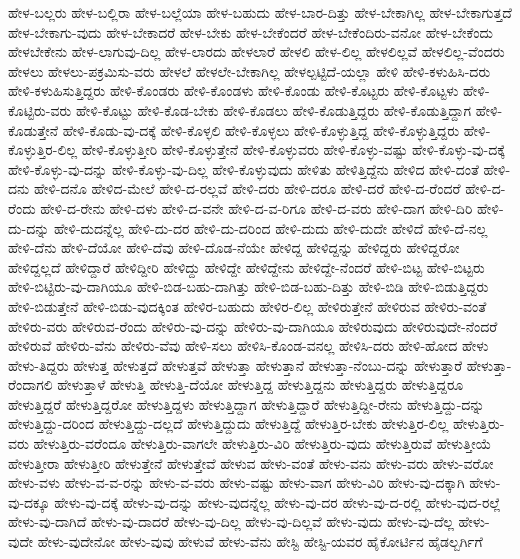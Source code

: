 {ಹೇಳ-ಬಲ್ಲರು
ಹೇಳ-ಬಲ್ಲಿರಾ
ಹೇಳ-ಬಲ್ಲೆಯಾ
ಹೇಳ-ಬಹುದು
ಹೇಳ-ಬಾರ-ದಿತ್ತು
ಹೇಳ-ಬೇಕಾಗಿಲ್ಲ
ಹೇಳ-ಬೇಕಾಗುತ್ತದೆ
ಹೇಳ-ಬೇಕಾಗು-ವುದು
ಹೇಳ-ಬೇಕಾದರೆ
ಹೇಳ-ಬೇಕು
ಹೇಳ-ಬೇಕೆಂದರೆ
ಹೇಳ-ಬೇಕೆಂದಿರು-ವನೋ
ಹೇಳ-ಬೇಕೆಂದು
ಹೇಳಬೇಕೇನು
ಹೇಳ-ಲಾಗುವು-ದಿಲ್ಲ
ಹೇಳ-ಲಾರದು
ಹೇಳಲಾರೆ
ಹೇಳಲಿ
ಹೇಳ-ಲಿಲ್ಲ
ಹೇಳಲಿಲ್ಲವೆ
ಹೇಳಲಿಲ್ಲ-ವೆಂದರು
ಹೇಳಲು
ಹೇಳಲು-ಪಕ್ರಮಿಸು-ವರು
ಹೇಳಲೆ
ಹೇಳಲೇ-ಬೇಕಾಗಿಲ್ಲ
ಹೇಳಲ್ಪಟ್ಟಿದೆ-ಯಲ್ಲಾ
ಹೇಳಿ
ಹೇಳಿ-ಕಳುಹಿಸಿ-ದರು
ಹೇಳಿ-ಕಳುಹಿಸುತ್ತಿದ್ದರು
ಹೇಳಿ-ಕೊಂಡರು
ಹೇಳಿ-ಕೊಂಡಳು
ಹೇಳಿ-ಕೊಂಡು
ಹೇಳಿ-ಕೊಟ್ಟರು
ಹೇಳಿ-ಕೊಟ್ಟಳು
ಹೇಳಿ-ಕೊಟ್ಟಿರು-ವರು
ಹೇಳಿ-ಕೊಟ್ಟು
ಹೇಳಿ-ಕೊಡ-ಬೇಕು
ಹೇಳಿ-ಕೊಡಲು
ಹೇಳಿ-ಕೊಡುತ್ತಿದ್ದರು
ಹೇಳಿ-ಕೊಡುತ್ತಿದ್ದಾಗ
ಹೇಳಿ-ಕೊಡುತ್ತೇನೆ
ಹೇಳಿ-ಕೊಡು-ವು-ದಕ್ಕೆ
ಹೇಳಿ-ಕೊಳ್ಳಲಿ
ಹೇಳಿ-ಕೊಳ್ಳಲು
ಹೇಳಿ-ಕೊಳ್ಳುತ್ತಿದ್ದ
ಹೇಳಿ-ಕೊಳ್ಳುತ್ತಿದ್ದರು
ಹೇಳಿ-ಕೊಳ್ಳುತ್ತಿರ-ಲಿಲ್ಲ
ಹೇಳಿ-ಕೊಳ್ಳುತ್ತೀರಿ
ಹೇಳಿ-ಕೊಳ್ಳುತ್ತೇನೆ
ಹೇಳಿ-ಕೊಳ್ಳುವರು
ಹೇಳಿ-ಕೊಳ್ಳು-ವಷ್ಟು
ಹೇಳಿ-ಕೊಳ್ಳು-ವು-ದಕ್ಕೆ
ಹೇಳಿ-ಕೊಳ್ಳು-ವು-ದನ್ನು
ಹೇಳಿ-ಕೊಳ್ಳು-ವು-ದಿಲ್ಲ
ಹೇಳಿ-ಕೊಳ್ಳುವುದು
ಹೇಳಿತು
ಹೇಳಿತ್ತಿದ್ದೆನು
ಹೇಳಿದ
ಹೇಳಿ-ದಂತೆ
ಹೇಳಿ-ದನು
ಹೇಳಿ-ದನೊ
ಹೇಳಿದ-ಮೇಲೆ
ಹೇಳಿ-ದ-ರಲ್ಲವೆ
ಹೇಳಿ-ದರು
ಹೇಳಿ-ದರೂ
ಹೇಳಿ-ದರೆ
ಹೇಳಿ-ದ-ರೆಂದರೆ
ಹೇಳಿ-ದ-ರೆಂದು
ಹೇಳಿ-ದ-ರೇನು
ಹೇಳಿ-ದಳು
ಹೇಳಿ-ದ-ವನೇ
ಹೇಳಿ-ದ-ವ-ರಿಗೂ
ಹೇಳಿ-ದ-ವರು
ಹೇಳಿ-ದಾಗ
ಹೇಳಿ-ದಿರಿ
ಹೇಳಿ-ದು-ದನ್ನು
ಹೇಳಿ-ದುದನ್ನೆಲ್ಲ
ಹೇಳಿ-ದು-ದರ
ಹೇಳಿ-ದು-ದರಿಂದ
ಹೇಳಿ-ದುದು
ಹೇಳಿ-ದುದೇ
ಹೇಳಿದೆ
ಹೇಳಿ-ದೆ-ನಲ್ಲ
ಹೇಳಿ-ದೆನು
ಹೇಳಿ-ದೆಯೋ
ಹೇಳಿ-ದೆವು
ಹೇಳಿ-ದೊಡ-ನೆಯೇ
ಹೇಳಿದ್ದ
ಹೇಳಿದ್ದನ್ನು
ಹೇಳಿದ್ದರು
ಹೇಳಿದ್ದರೋ
ಹೇಳಿದ್ದಲ್ಲದೆ
ಹೇಳಿದ್ದಾರೆ
ಹೇಳಿದ್ದೀರಿ
ಹೇಳಿದ್ದು
ಹೇಳಿದ್ದೇ
ಹೇಳಿದ್ದೇನು
ಹೇಳಿದ್ದೇ-ನೆಂದರೆ
ಹೇಳಿ-ಬಿಟ್ಟ
ಹೇಳಿ-ಬಿಟ್ಟರು
ಹೇಳಿ-ಬಿಟ್ಟಿರು-ವು-ದಾಗಿಯೂ
ಹೇಳಿ-ಬಿಡ-ಬಹು-ದಾಗಿತ್ತು
ಹೇಳಿ-ಬಿಡ-ಬಹು-ದಿತ್ತು
ಹೇಳಿ-ಬಿಡಿ
ಹೇಳಿ-ಬಿಡುತ್ತಿದ್ದರು
ಹೇಳಿ-ಬಿಡುತ್ತೇನೆ
ಹೇಳಿ-ಬಿಡು-ವುದಕ್ಕಿಂತ
ಹೇಳಿರ-ಬಹುದು
ಹೇಳಿರ-ಲಿಲ್ಲ
ಹೇಳಿರುತ್ತೇನೆ
ಹೇಳಿರುವ
ಹೇಳಿರು-ವಂತೆ
ಹೇಳಿರು-ವರು
ಹೇಳಿರುವ-ರೆಂದು
ಹೇಳಿರು-ವು-ದನ್ನು
ಹೇಳಿರು-ವು-ದಾಗಿಯೂ
ಹೇಳಿರುವುದು
ಹೇಳಿರುವುದೇ-ನೆಂದರೆ
ಹೇಳಿರುವೆ
ಹೇಳಿರು-ವೆನು
ಹೇಳಿರು-ವೆವು
ಹೇಳಿ-ಸಲು
ಹೇಳಿಸಿ-ಕೊಂಡ-ವನಲ್ಲ
ಹೇಳಿಸಿ-ದರು
ಹೇಳಿ-ಹೋದ
ಹೇಳು
ಹೇಳು-ತಿದ್ದರು
ಹೇಳುತ್ತ
ಹೇಳುತ್ತದೆ
ಹೇಳುತ್ತವೆ
ಹೇಳುತ್ತಾ
ಹೇಳುತ್ತಾನೆ
ಹೇಳುತ್ತಾ-ನೆಂಬು-ದನ್ನು
ಹೇಳುತ್ತಾರೆ
ಹೇಳುತ್ತಾ-ರೆಂದಾಗಲಿ
ಹೇಳುತ್ತಾಳೆ
ಹೇಳುತ್ತಿ
ಹೇಳುತ್ತಿ-ದೆಯೋ
ಹೇಳುತ್ತಿದ್ದ
ಹೇಳುತ್ತಿದ್ದನು
ಹೇಳುತ್ತಿದ್ದರು
ಹೇಳುತ್ತಿದ್ದರೂ
ಹೇಳುತ್ತಿದ್ದರೆ
ಹೇಳುತ್ತಿದ್ದರೋ
ಹೇಳುತ್ತಿದ್ದಳು
ಹೇಳುತ್ತಿದ್ದಾಗ
ಹೇಳುತ್ತಿದ್ದಾರೆ
ಹೇಳುತ್ತಿದ್ದೀ-ರೇನು
ಹೇಳುತ್ತಿದ್ದು-ದನ್ನು
ಹೇಳುತ್ತಿದ್ದು-ದರಿಂದ
ಹೇಳುತ್ತಿದ್ದು-ದಲ್ಲದೆ
ಹೇಳುತ್ತಿದ್ದುದು
ಹೇಳುತ್ತಿದ್ದೆ
ಹೇಳುತ್ತಿರ-ಬೇಕು
ಹೇಳುತ್ತಿರ-ಲಿಲ್ಲ
ಹೇಳುತ್ತಿರು-ವರು
ಹೇಳುತ್ತಿರು-ವರೆಂದೂ
ಹೇಳುತ್ತಿರು-ವಾಗಲೇ
ಹೇಳುತ್ತಿರು-ವಿರಿ
ಹೇಳುತ್ತಿರು-ವುದು
ಹೇಳುತ್ತಿರುವೆ
ಹೇಳುತ್ತೀಯೆ
ಹೇಳುತ್ತೀರಾ
ಹೇಳುತ್ತೀರಿ
ಹೇಳುತ್ತೇನೆ
ಹೇಳುತ್ತೇವೆ
ಹೇಳುವ
ಹೇಳು-ವಂತೆ
ಹೇಳು-ವನು
ಹೇಳು-ವರು
ಹೇಳು-ವರೋ
ಹೇಳು-ವಳು
ಹೇಳು-ವ-ವ-ರನ್ನು
ಹೇಳು-ವ-ವರು
ಹೇಳು-ವಷ್ಟು
ಹೇಳು-ವಾಗ
ಹೇಳು-ವಿರಿ
ಹೇಳು-ವು-ದಕ್ಕಾಗಿ
ಹೇಳು-ವು-ದಕ್ಕೂ
ಹೇಳು-ವು-ದಕ್ಕೆ
ಹೇಳು-ವು-ದನ್ನು
ಹೇಳು-ವುದನ್ನೆಲ್ಲ
ಹೇಳು-ವು-ದರ
ಹೇಳು-ವು-ದ-ರಲ್ಲಿ
ಹೇಳು-ವುದ-ರಲ್ಲೆ
ಹೇಳು-ವು-ದಾಗಿದೆ
ಹೇಳು-ವು-ದಾದರೆ
ಹೇಳು-ವು-ದಿಲ್ಲ
ಹೇಳು-ವು-ದಿಲ್ಲವೆ
ಹೇಳು-ವುದು
ಹೇಳು-ವು-ದೆಲ್ಲ
ಹೇಳು-ವುದೇ
ಹೇಳು-ವುದೇನೋ
ಹೇಳು-ವುವು
ಹೇಳುವೆ
ಹೇಳು-ವೆನು
ಹೇಸ್ಟಿ
ಹೇಸ್ಟಿ-ಯವರ
ಹೈಕೋರ್ಟಿನ
ಹೈಡಲ್ಬರ್ಗಿಗೆ
}

